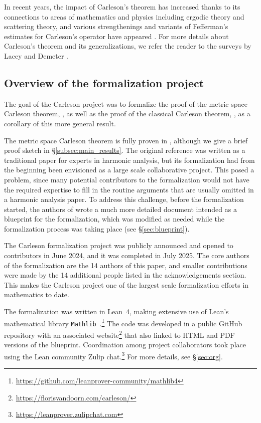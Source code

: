 \documentclass[12pt, reqno]{amsart}
\newcommand{\mathlib}{\texttt{Mathlib}\xspace}
\theoremstyle{definition}
\theoremstyle{plain}
\begin{document}
In recent years, the impact of Carleson's theorem has increased thanks to its connections to areas of mathematics and physics including ergodic theory and scattering theory, and various strengthenings and variants of Fefferman's estimates for Carleson's operator have appeared \cite[\S 1]{CarlesonBlueprint}. For more details about Carleson's theorem and its generalizations, we refer the reader to the surveys by Lacey \cite{MR2091007} and Demeter \cite{MR3334208}.

\subsection{Overview of the formalization project}\label{subsec:overview}
The goal of the Carleson project was to formalize the proof of the metric space Carleson theorem, , as well as the proof of the classical Carleson theorem, , as a corollary of this more general result.

The metric space Carleson theorem is fully proven in \cite{ThieleCarlesonPreprint}, although we give a brief proof sketch in \S\ref{subsec:main_results}.
The original reference \cite{ThieleCarlesonPreprint} was written as a traditional paper for experts in harmonic analysis, but its formalization had from the beginning been envisioned as a large scale collaborative project. This posed a problem, since many potential contributors to the formalization would not have the required expertise to fill in the routine arguments that are usually omitted in a harmonic analysis paper.
To address this challenge, before the formalization started, the authors of \cite{ThieleCarlesonPreprint} wrote a much more detailed document \cite{CarlesonBlueprint} intended as a blueprint for the formalization, which was modified as needed while the formalization process was taking place (see \S\ref{sec:blueprint}).

The Carleson formalization project was publicly announced and opened to contributors in June 2024, and it was completed in July 2025. The core authors of the formalization are the 14 authors of this paper, and smaller contributions were made by the 14 additional people listed in the acknowledgements section. This makes the Carleson project one of the largest scale formalization efforts in mathematics to date.

The formalization was written in Lean~4, making extensive use of Lean's mathematical library \mathlib~\cite{mathlib}.\footnote{\url{https://github.com/leanprover-community/mathlib4}}
The code was developed in a public GitHub repository with an associated website\footnote{\url{https://florisvandoorn.com/carleson/}} that also linked to HTML and PDF versions of the blueprint. Coordination among project collaborators took place using the Lean community Zulip chat.\footnote{\url{https://leanprover.zulipchat.com}} For more details, see \S\ref{sec:org}.
\end{document}
